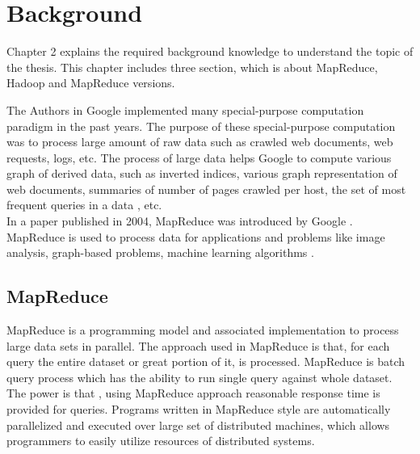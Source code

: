 
\chapter{Background} %

\label{Chapter2} %


  Chapter 2 explains the required background knowledge to understand the topic of the thesis. This chapter includes three section, which is about MapReduce, Hadoop and MapReduce versions. 
   
    The Authors in Google implemented many special-purpose computation paradigm in the past years. The purpose of these special-purpose computation was to process large amount of raw data such as crawled web documents, web requests, logs, etc. The process of large data helps Google to compute various graph of derived data, such as inverted indices, various graph representation of web documents, summaries of number of pages crawled per host, the set of most frequent queries in a data , etc.\cite{google}\\

In a paper published in 2004, MapReduce was introduced by Google \cite{mapreduce}. MapReduce is used to process data for applications and problems like image analysis, graph-based problems, machine learning algorithms \cite{mahout}.



  
  
\section{MapReduce}

MapReduce is a programming model and associated implementation to process large data sets in parallel. The approach used in MapReduce is that, for each query the entire dataset or great portion of it, is processed. MapReduce is batch query process which has the ability to run single query against whole dataset. The power is that , using MapReduce approach reasonable response time is provided for queries. Programs written in MapReduce style are automatically parallelized and executed over large set of distributed machines, which allows programmers to easily utilize resources of distributed systems. \\

